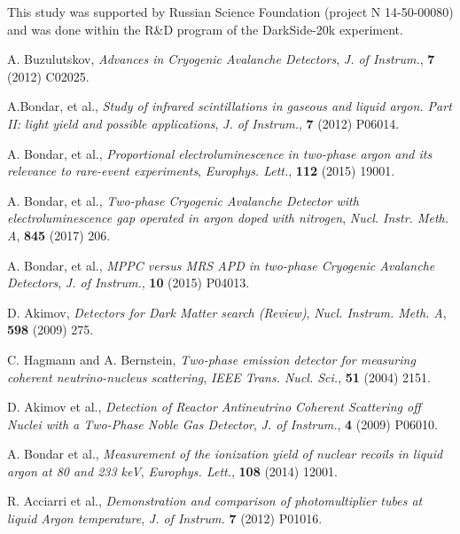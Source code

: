 \documentclass[a4paper,11pt]{article}
\begin{document}
\acknowledgments

 This study was supported by Russian Science Foundation (project N 14-50-00080) and was done within the R\&D program of the DarkSide-20k experiment.


\begin{thebibliography}{99}

A. Buzulutskov, \emph{Advances in Cryogenic Avalanche Detectors}, \emph{J. of Instrum.}, {\bf 7} (2012) C02025.
                                      
A.Bondar, et al., \emph{Study of infrared scintillations in gaseous and liquid argon. 
Part II: light yield and possible applications}, \emph{J. of Instrum.}, {\bf 7} (2012) P06014.

A. Bondar, et al., \emph{Proportional electroluminescence in two-phase argon and its relevance to rare-event experiments}, 
\emph{Europhys. Lett.}, {\bf 112} (2015) 19001.

A. Bondar, et al., \emph{Two-phase Cryogenic Avalanche Detector with electroluminescence gap operated in argon doped with nitrogen}, 
\emph{Nucl. Instr. Meth. A}, {\bf 845} (2017) 206. 

A. Bondar, et al., \emph{MPPC versus MRS APD in two-phase Cryogenic Avalanche Detectors}, 
\emph{J. of Instrum.}, {\bf 10} (2015) P04013.

D. Akimov, \emph{Detectors for Dark Matter search (Review)}, \emph{Nucl. Instrum. Meth. A}, {\bf 598} (2009) 275.

C. Hagmann and A. Bernstein, \emph{Two-phase emission detector for measuring coherent
neutrino-nucleus scattering}, \emph{IEEE Trans. Nucl. Sci.}, {\bf 51} (2004) 2151.

D. Akimov et al., \emph{Detection of Reactor Antineutrino Coherent Scattering off Nuclei with a Two-Phase
Noble Gas Detector}, \emph{J. of Instrum.}, {\bf 4} (2009) P06010.

A. Bondar et al., \emph{Measurement of the ionization yield of nuclear recoils
in liquid argon at 80 and 233 keV}, \emph{Europhys. Lett.}, {\bf 108} (2014) 12001.

R. Acciarri et al., \emph{Demonstration and comparison of photomultiplier tubes at liquid Argon temperature},
\emph{J. of Instrum.} {\bf 7} (2012) P01016.


\end{thebibliography}
\end{document}
